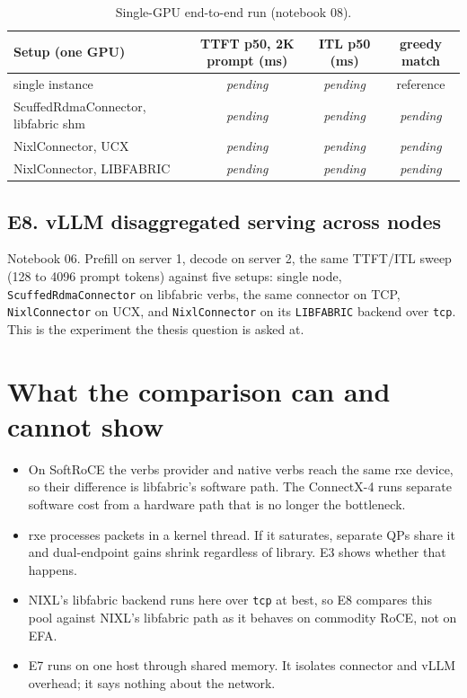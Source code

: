 \documentclass[11pt,letterpaper]{article}
\newcommand{\pend}{\textit{pending}}
\begin{document}
\begin{table}[ht]
\centering\small
\begin{tabular}{@{}lccc@{}}
\toprule
Setup (one GPU) & TTFT p50, 2K prompt (ms) & ITL p50 (ms) & greedy match \\
\midrule
single instance & \pend & \pend & reference \\
ScuffedRdmaConnector, libfabric shm & \pend & \pend & \pend \\
NixlConnector, UCX & \pend & \pend & \pend \\
NixlConnector, LIBFABRIC & \pend & \pend & \pend \\
\bottomrule
\end{tabular}
\caption{Single-GPU end-to-end run (notebook 08).}
\end{table}

\subsection{E8. vLLM disaggregated serving across nodes}
Notebook 06. Prefill on server 1, decode on server 2, the same TTFT/ITL sweep (128 to 4096 prompt tokens) against five setups: single node, \texttt{ScuffedRdmaConnector} on libfabric verbs, the same connector on TCP, \texttt{NixlConnector} on UCX, and \texttt{NixlConnector} on its \texttt{LIBFABRIC} backend over \texttt{tcp}. This is the experiment the thesis question is asked at.

\section{What the comparison can and cannot show}

\begin{itemize}
\item On SoftRoCE the verbs provider and native verbs reach the same rxe device, so their difference is libfabric's software path. The ConnectX-4 runs separate software cost from a hardware path that is no longer the bottleneck.
\item rxe processes packets in a kernel thread. If it saturates, separate QPs share it and dual-endpoint gains shrink regardless of library. E3 shows whether that happens.
\item NIXL's libfabric backend runs here over \texttt{tcp} at best, so E8 compares this pool against NIXL's libfabric path as it behaves on commodity RoCE, not on EFA.
\item E7 runs on one host through shared memory. It isolates connector and vLLM overhead; it says nothing about the network.
\end{itemize}
\end{document}
